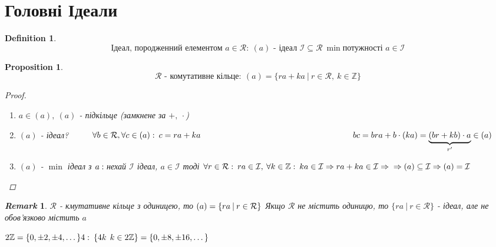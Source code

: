 \documentclass[a4paper,12pt, centered]{bookest}
\newtheorem{definition}{Definition}[section]
\newtheorem*{prop*}{Proposition}
\newtheorem*{remark*}{\emph{Remark}}
\newcommand\tab[1][1cm]{\hspace*{#1}}
\begin{document}
\section{Головні Ідеали}
\begin{definition}
	$$\textrm{Ідеал, породженний елементом }a\in\mathcal{R}:\>(a)\textrm{ - ідеал }\mathcal{I}\subseteq\mathcal{R}\>\min\textrm{потужності }a\in\mathcal{I}$$
\end{definition}
\begin{prop*}
	$$\mathcal{R}\textrm{ - комутативне кільце}:\>(a)=\{ra+ka\>|\>r\in\mathcal{R},\>k\in\mathbb{Z}\}$$
	\begin{proof}$ $
		\begin{enumerate}
			\item $a\in(a),\>(a)$ - підкільце (замкнене за $+,\>\cdot$)
			\item $(a)$ - ідеал?$\tab \forall b\in\mathcal{R},\forall c\in(a):\>c=ra+ka\\\hspace*{6.5cm} bc=bra+b\cdot(ka)=\underbrace{(br+kb)\cdot a}_{r'}\in(a)$
			\item $(a)$ - $\min$ ідеал з $a:\\$нехай $\mathcal{I}$ ідеал, $a\in\mathcal{I}$ тоді $\forall r\in\mathcal{R}:\>ra\in\mathcal{I},\>\forall k\in\mathbb{Z}:\>ka\in\mathcal{I}\Rightarrow ra+ka\in\mathcal{I}\Rightarrow\\\Rightarrow(a)\subseteq\mathcal{I}\Rightarrow(a)=\mathcal{I}$ 
		\end{enumerate}
	\end{proof}
\end{prop*}
\begin{remark*}
	$\mathcal{R}$ - кмутативне кільце з одиницею, то $(a)=\{ra\>|\>r\in\mathcal{R}\}\\$ Якщо $\mathcal{R}$ не містить одиницю, то $\{ra\>|\>r\in\mathcal{R}\}$ - ідеал, але не обов'язково містить $a$
\end{remark*}
\begin{example}
	$2\mathbb{Z}=\{0,\pm2,\pm4,\dots\}\\4:\>\{4k\>\>k\in2\mathbb{Z}\}=\{0,\pm8,\pm16,\dots\}$
\end{example}
\end{document}
